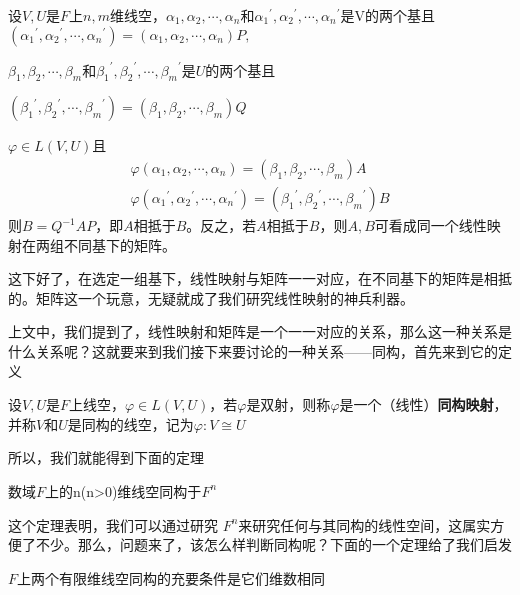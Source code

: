 \documentclass[lang=cn,10pt]{elegantbook}
\begin{document}
	\begin{theorem}
		设$V,U$是$F$上$n,m$维线空，$\alpha_1,\alpha_2,\cdots,\alpha_n$和${\alpha_1}^\prime,{\alpha_2}^\prime,\cdots,{\alpha_n}^\prime$是V的两个基且$({\alpha_1}^\prime,{\alpha_2}^\prime,\cdots,{\alpha_n}^\prime)=(\alpha_1,\alpha_2,\cdots,\alpha_n)P,$
		
		$\beta_1,\beta_2,\cdots,\beta_m$和${\beta_1}^\prime,{\beta_2}^\prime,\cdots,{\beta_m}^\prime$是$U$的两个基且
		
		$({\beta_1}^\prime,{\beta_2}^\prime,\cdots,{\beta_m}^\prime)=(\beta_1,\beta_2,\cdots,\beta_m)Q$
		
		$\varphi\in L(V,U)$且
		\begin{equation*}
			\begin{split}
				\varphi(\alpha_1,\alpha_2,\cdots,\alpha_n)=(\beta_1,\beta_2,\cdots,\beta_m)A
				\\
				\varphi({\alpha_1}^\prime,{\alpha_2}^\prime,\cdots,{\alpha_n}^\prime)=({\beta_1}^\prime,{\beta_2}^\prime,\cdots,{\beta_m}^\prime)B				
			\end{split}
		\end{equation*}
		则$B=Q^{-1}AP$，即$A$相抵于$B$。反之，若$A$相抵于$B$，则$A,B$可看成同一个线性映射在两组不同基下的矩阵。
	\end{theorem}
	
	这下好了，在选定一组基下，线性映射与矩阵一一对应，在不同基下的矩阵是相抵的。矩阵这一个玩意，无疑就成了我们研究线性映射的神兵利器。
	
	上文中，我们提到了，线性映射和矩阵是一个一一对应的关系，那么这一种关系是什么关系呢？这就要来到我们接下来要讨论的一种关系——同构，首先来到它的定义
	
	\begin{definition}[同构映射]
		设$V,U$是$F$上线空，$\varphi\in L(V,U)$，若$\varphi$是双射，则称$\varphi$是一个（线性）\textbf{同构映射}，并称$V$和$U$是同构的线空，记为$\varphi:V\cong U$
	\end{definition}
	所以，我们就能得到下面的定理
	\begin{theorem}
		数域$F$上的n(n>0)维线空同构于$F^n$
	\end{theorem}
	
	这个定理表明，我们可以通过研究
	$F^n$来研究任何与其同构的线性空间，这属实方便了不少。那么，问题来了，该怎么样判断同构呢？下面的一个定理给了我们启发
	
	\begin{theorem}
		$F$上两个有限维线空同构的充要条件是它们维数相同
	\end{theorem}
	
\end{document}

